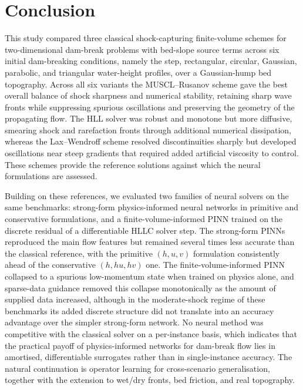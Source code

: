 \documentclass[12pt]{article}
\newenvironment{newtext}{\par\color{red}}{\par}
\begin{document}
\begin{newtext}
\section{Conclusion}


This study compared three classical shock-capturing finite-volume schemes for two-dimensional dam-break problems with bed-slope source terms across six initial dam-breaking conditions, namely the step, rectangular, circular, Gaussian, parabolic, and triangular water-height profiles, over a Gaussian-hump bed topography. Across all six variants the MUSCL--Rusanov scheme gave the best overall balance of shock sharpness and numerical stability, retaining sharp wave fronts while suppressing spurious oscillations and preserving the geometry of the propagating flow. The HLL solver was robust and monotone but more diffusive, smearing shock and rarefaction fronts through additional numerical dissipation, whereas the Lax--Wendroff scheme resolved discontinuities sharply but developed oscillations near steep gradients that required added artificial viscosity to control. These schemes provide the reference solutions against which the neural formulations are assessed.

Building on these references, we evaluated two families of neural solvers on the same benchmarks: strong-form physics-informed neural networks in primitive and conservative formulations, and a finite-volume-informed PINN trained on the discrete residual of a differentiable HLLC solver step. The strong-form PINNs reproduced the main flow features but remained several times less accurate than the classical reference, with the primitive $(h,u,v)$ formulation consistently ahead of the conservative $(h,hu,hv)$ one. The finite-volume-informed PINN collapsed to a spurious low-momentum state when trained on physics alone, and sparse-data guidance removed this collapse monotonically as the amount of supplied data increased, although in the moderate-shock regime of these benchmarks its added discrete structure did not translate into an accuracy advantage over the simpler strong-form network. No neural method was competitive with the classical solver on a per-instance basis, which indicates that the practical payoff of physics-informed networks for dam-break flow lies in amortised, differentiable surrogates rather than in single-instance accuracy. The natural continuation is operator learning for cross-scenario generalisation, together with the extension to wet/dry fronts, bed friction, and real topography.
\end{newtext}



\end{document}
